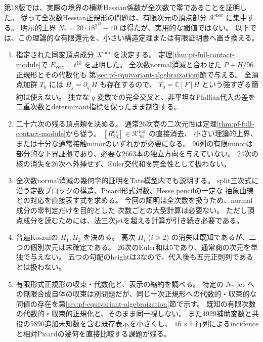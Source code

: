 第18版では、実際の境界の横断Hessian係数が全次数で零であることを証明した。
従って全次数Hessian正規形の問題は、有限次元の頂点部分
$\mathcal K^{\mathrm{nor}}$ に集中する。
明示的上界 $N_*=20\cdot18^{2^{43}}-10$ は得たが、実用的な閾値ではない。
以下では、この理論的な有限還元を、小さい構造定理または有限証明書へ置き換える。
\begin{enumerate}
 \item 指定された同変頂点成分 $\mathcal K^{\mathrm{nor}}$ を決定する。
 定理\ref{thm:pf-full-contact-module}で $E_{\mathrm{vert}}=t^{10}$ を証明した。
 全次数normal消滅と合わせた $P+H/96$ 正規形とその代数化も
 第\ref{sec:pf-equivariant-algebraization}節で与える。
 全頂点加群 $T_0$ には $H_j=\partial_{q_j}H$ も存在するので、
 $T_0=\mathbb C[F]H$ という強すぎる簡約は使えない。
 独立な $q$ 変数での完全交叉と、非平坦なPfaffian代入の差を
 二重次数とdeterminant指標を保ったまま制御する。

 \item 二十六次の残る頂点類を決める。
 通常26次商の二次元性は定理\ref{thm:pf-full-contact-module}から従う。
 $[R_{26}^{\mathrm{ev}}]\in\mathcal K_{26}^{\mathrm{nor}}$ の直接消去、
 小さい理論的上界、または十分な通常接触minorのいずれかが必要になる。
 96列の有限minorは部分的な下界証拠であり、必要な2663本の独立方向を与えていない。
 24次の核の消失を26次へ外挿せず、Euler交代和を完全性として扱わない。

 \item 全次数normal消滅の幾何学的証明をTate模型内でも説明する。
 split三次式に沿う定数ブロックの構造、Picard形式対数、Hesse pencilの一定な
 抽象曲線との対応を直接表す式を求める。
 今回の証明は全次数を扱うため、normal成分の零判定だけを目的とした
 次数ごとの大型計算は必要ない。
 ただし頂点成分を読むためには、法三次jetを超える計算が引き続き必要である。

 \item 普遍Koszulの $H_1,H_2$ を決める。
 高次 $H_i$ ($i>2$) の消失は既知であるが、二つの個別次元は未確定である。
 26次のEuler和は5であり、通常商の次元を単独で与えない。
 五つの勾配のheightは3なので、代入後も五元正則列であるとは扱わない。

 \item 有限形式正規形の収束・代数化と、表示の縮約を調べる。
 特定の $N_*$-jet への無限合成自体の収束は別問題だが、同じ十次正規形への代数的・収束的な同値の存在を第\ref{sec:pf-equivariant-algebraization}節で示す。
 既知の有限次数の代数的・収束的正規化と、そのまま同一視しない。
 また4929補助変数と共役の5890追加未知数を含む既存表示を小さくし、
 $16\times5$ 行列によるincidenceと相対Picardの幾何を直接比較する課題が残る。


\end{enumerate}
